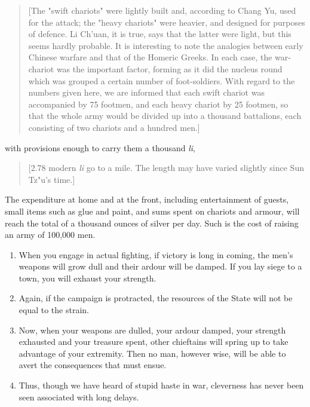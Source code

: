 \documentclass[10pt,a4paper]{book}
\begin{document}
{\small
\begin{quote}
[The "swift chariots" were lightly built and, according to Chang Yu, used for the attack; the "heavy chariots" were heavier, and designed for purposes of defence. Li Ch'uan, it is true, says that the latter were light, but this seems hardly probable. It is interesting to note the analogies between early Chinese warfare and that of the Homeric Greeks. In each case, the war-chariot was the important factor, forming as it did the nucleus round which was grouped a certain number of foot-soldiers. With regard to the numbers given here, we are informed that each swift chariot was accompanied by 75 footmen, and each heavy chariot by 25 footmen, so that the whole army would be divided up into a thousand battalions, each consisting of two chariots and a hundred men.]
\end{quote}
}

with provisions enough to carry them a thousand \textit{li},

{\small
\begin{quote}
[2.78 modern \textit{li} go to a mile. The length may have varied slightly since Sun Tz"u's time.]
\end{quote}
}
The expenditure at home and at the front, including entertainment of guests, small items such as glue and paint, and sums spent on chariots and armour, will reach the total of a thousand ounces of silver per day. Such is the cost of raising an army of 100,000 men.

\begin{enumerate}[leftmargin=*, label=\arabic*.,wide=0pt, resume]
\item When you engage in actual fighting, if victory is long in coming, the men's weapons will grow dull and their ardour will be damped. If you lay siege to a town, you will exhaust your strength.
\item Again, if the campaign is protracted, the resources of the State will not be equal to the strain.
\item Now, when your weapons are dulled, your ardour damped, your strength exhausted and your treasure spent, other chieftains will spring up to take advantage of your extremity. Then no man, however wise, will be able to avert the consequences that must ensue.
\item Thus, though we have heard of stupid haste in war, cleverness has never been seen associated with long delays.
\end{enumerate}
\end{document}
